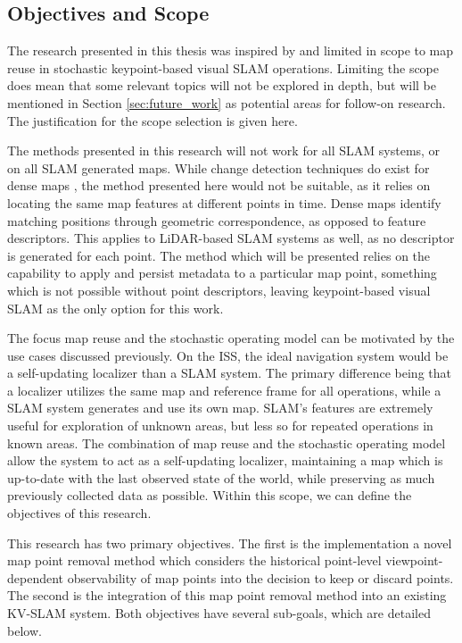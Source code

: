 \subsection{Objectives and Scope}
\label{objectives}

The research presented in this thesis was inspired by and limited in scope to map reuse in stochastic keypoint-based visual SLAM operations. Limiting the scope does mean that some relevant topics will not be explored in depth, but will be mentioned in Section \ref{sec:future_work} as potential areas for follow-on research. The justification for the scope selection is given here.

The methods presented in this research will not work for all SLAM systems, or on all SLAM generated maps. While change detection techniques do exist for dense maps \cite{PLACEHOLDERa}, the method presented here would not be suitable, as it relies on locating the same map features at different points in time. Dense maps identify matching positions through geometric correspondence, as opposed to feature descriptors. This applies to LiDAR-based SLAM systems as well, as no descriptor is generated for each point. The method which will be presented relies on the capability to apply and persist metadata to a particular map point, something which is not possible without point descriptors, leaving keypoint-based visual SLAM as the only option for this work.

The focus map reuse and the stochastic operating model can be motivated by the use cases discussed previously. On the ISS, the ideal navigation system would be a self-updating localizer than a SLAM system. The primary difference being that a localizer utilizes the same map and reference frame for all operations, while a SLAM system generates and use its own map. SLAM's features are extremely useful for exploration of unknown areas, but less so for repeated operations in known areas. The combination of map reuse and the stochastic operating model allow the system to act as a self-updating localizer, maintaining a map which is up-to-date with the last observed state of the world, while preserving as much previously collected data as possible. Within this scope, we can define the objectives of this research.

This research has two primary objectives. The first is the implementation a novel map point removal method which considers the historical point-level viewpoint-dependent observability of map points into the decision to keep or discard points. The second is the integration of this map point removal method into an existing KV-SLAM system. Both objectives have several sub-goals, which are detailed below.

